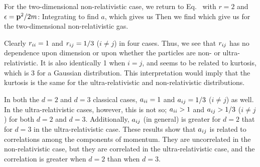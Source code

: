 {	For the two-dimensional non-relativistic case, we return to Eq.~ with $r=2$ and $\epsilon = \vb{p}^2/2m$:
	Integrating to find $a$,
	which gives us
	Then we find
	which give us
	for the two-dimensional non-relativistic gas.
	
	Clearly $r_{ii} = 1$ and $r_{ij} = 1/3$ ($i \neq j$) in four cases.  Thus, we see that $r_{ij}$ has no dependence upon dimension or upon whether the particles are non- or ultra-relativistic.  It is also identically 1 when $i = j$, and seems to be related to kurtosis, which is 3 for a Gaussian distribution.  This interpretation would imply that the kurtosis is the same for the ultra-relativistic and non-relativistic distributions.
	
	In both the $d = 2$ and $d = 3$ classical cases, $a_{ii} = 1$ and $a_{ij} = 1/3$ ($i \neq j$) as well.  In the ultra-relativistic cases, however, this is not so; $a_{ii} > 1$ and $a_{ij} > 1/3$ ($i \neq j$) for both $d = 2$ and $d = 3$.  Additionally, $a_{ij}$ (in general) is greater for $d = 2$ that for $d = 3$ in the ultra-relativistic case.  These results show that $a_{ij}$ is related to correlations among the components of momentum.  They are uncorrelated in the non-relativistic case, but they are correlated in the ultra-relativistic case, and the correlation is greater when $d = 2$ than when $d = 3$.
}